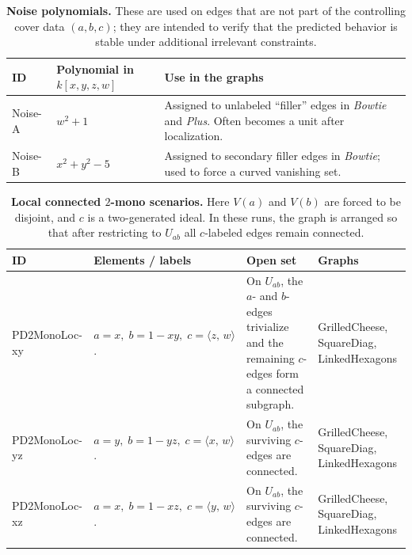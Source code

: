 \documentclass{article}
\begin{document}
\begin{table}[ht]
\centering
\footnotesize
\setlength{\extrarowheight}{0.25em}
\begin{tabularx}{\linewidth}{|l|Y|Y|}
\hline
\textbf{ID} &
\textbf{Polynomial in \(k[x,y,z,w]\)} &
\textbf{Use in the graphs} \\
\hline\hline

Noise-A &
\(w^2+1\) &
Assigned to unlabeled “filler” edges in \textit{Bowtie} and \textit{Plus}. Often becomes a unit after localization. \\
\hline

Noise-B &
\(x^2+y^2-5\) &
Assigned to secondary filler edges in \textit{Bowtie}; used to force a curved vanishing set. \\
\hline

\end{tabularx}
\caption{\textbf{Noise polynomials.} These are used on edges that are not part of the controlling cover data \((a,b,c)\); they are intended to verify that the predicted behavior is stable under additional irrelevant constraints.}
\label{tab:noise-polynomials}
\end{table}



\begin{table}[ht]
\centering
\footnotesize
\setlength{\extrarowheight}{0.25em}
\begin{tabularx}{\linewidth}{|l|Y|Y|Y|}
\hline
\textbf{ID} &
\textbf{Elements / labels} &
\textbf{Open set} &
\textbf{Graphs} \\
\hline\hline

PD2MonoLoc-xy &
\(a=x,\; b=1-xy,\; c=\langle z,\,w\rangle\). &
On \(U_{ab}\), the \(a\)- and \(b\)-edges trivialize and the remaining \(c\)-edges form a connected subgraph. &
GrilledCheese,\; SquareDiag,\; LinkedHexagons \\
\hline

PD2MonoLoc-yz &
\(a=y,\; b=1-yz,\; c=\langle x,\,w\rangle\). &
On \(U_{ab}\), the surviving \(c\)-edges are connected. &
GrilledCheese,\; SquareDiag,\; LinkedHexagons \\
\hline

PD2MonoLoc-xz &
\(a=x,\; b=1-xz,\; c=\langle y,\,w\rangle\). &
On \(U_{ab}\), the surviving \(c\)-edges are connected. &
GrilledCheese,\; SquareDiag,\; LinkedHexagons \\
\hline
\end{tabularx}
\caption{\textbf{Local connected \(2\)-mono scenarios.} Here \(V(a)\) and \(V(b)\) are forced to be disjoint, and \(c\) is a two-generated ideal. In these runs, the graph is arranged so that after restricting to \(U_{ab}\) all \(c\)-labeled edges remain connected.}
\label{tab:pd2monoloc-labels}
\end{table}
\end{document}
